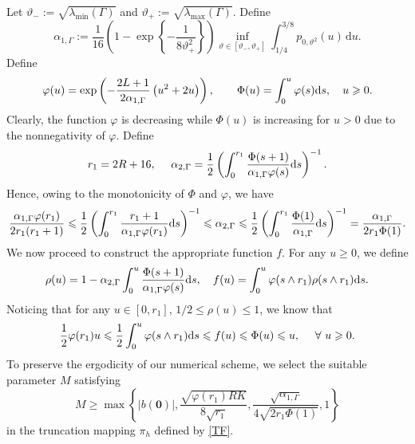 \documentclass[aap]{imsart}
\theoremstyle{plain}
\theoremstyle{definition}
\begin{document}
Let \(\vartheta_-:=\sqrt{\lambda_{\min}(\Gamma)}\) and \(\vartheta_+:=\sqrt{\lambda_{\max}(\Gamma)}\). Define
\begin{equation}\label{c0}
\alpha_{1, \Gamma} := \frac1{16}
\left(1-\exp\left\{-\frac{1}{8\vartheta_+^2}\right\}\right)\inf_{\vartheta\in[\vartheta_-,\vartheta_+]}\int_{1/4}^{3/8}p_{0,\vartheta^2}(u)\,\mathrm du .
\end{equation}
Define 				
\begin{equation}\label{varphi}
\varphi (u) = \mathrm{exp}\left(-\frac{2L+1}{2\alpha_{1, \Gamma}}\left(u^2+2u\right)\right), \quad\quad\Phi(u)= \int_0^u \varphi(s) \mathrm{d} s, \quad u\geqslant 0.
\end{equation}	
Clearly, the function $\varphi$ is decreasing  
while $\Phi(u)$ is increasing for $u>0$ due to the nonnegativity of $\varphi$. 
Define 			
\begin{equation}\label{Ac} 
r_1 = 2R+16 ,~~~~
\alpha_{2, \Gamma}= \frac{1}{2}\left(\int_0^{r_1}\frac{\Phi(s+1)}{\alpha_{1, \Gamma}\varphi(s)}\mathrm{d} s\right)^{-1}.
\end{equation} 
Hence, owing to the monotonicity of $\Phi$ and $\varphi$, we have 
\begin{equation}\label{dd6}
\frac{\alpha_{1, \Gamma}\varphi(r_1)}{2r_1(r_1+1)}\leqslant \frac{1}{2}\left(\int_0^{r_1}\frac{r_1+1}{\alpha_{1, \Gamma}\varphi(r_1)}\mathrm{d} s\right)^{-1}\leqslant \alpha_{2, \Gamma}\leqslant \frac{1}{2}\left(\int_0^{r_1}\frac{\Phi(1)}{\alpha_{1, \Gamma}}\mathrm{d} s\right)^{-1} =
 \frac{\alpha_{1, \Gamma}}{2r_1\Phi(1)}.
\end{equation}
We now proceed to construct the appropriate function $f$. For any $u\geqslant 0$, we define 
\begin{equation}\label{f}
\rho(u) = 1- \alpha_{2, \Gamma}\int_0^u \frac{\Phi(s+1)}{\alpha_{1, \Gamma}\varphi(s)}\mathrm{d} s,  \quad f(u) = \int_0^u \varphi (s\wedge r_1)\rho(s\wedge r_1) \mathrm{d} s.
\end{equation}
Noticing that for any $u\in[0, r_1]$,  $1/2\leqslant \rho(u) \leqslant 1$, we know that  
\begin{equation}\label{f1}
\frac{1}{2}\varphi(r_1)u\leqslant \frac{1}{2}\int_0^u\varphi(s\wedge r_1) \mathrm{d} s \leqslant f(u)\leqslant \Phi(u)\leqslant u, ~~~~\forall~ u\geqslant 0.
\end{equation}
To preserve the ergodicity of our numerical scheme, we select the suitable parameter $M$ satisfying
\begin{equation}\label{M1}
M \geqslant
\max\left\{|b(\mathbf{0})|, \frac{\sqrt{\varphi(r_1)RK}}{8\sqrt{r_1}}, \frac{\sqrt{\alpha_{1, \Gamma}}}{4\sqrt{2r_1\Phi(1)}}, 1\right\} 
\end{equation} in the truncation mapping $\pi_h$ defined by \eqref{TF}.
\end{document}
